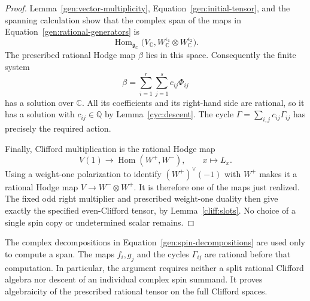 \begin{proof}
Lemma~\ref{gen:vector-multiplicity},
Equation~\eqref{gen:initial-tensor}, and the spanning calculation show
that the complex span of the maps in
Equation~\eqref{gen:rational-generators} is
\[
 \operatorname{Hom}_{\mathfrak g_{\mathbb C}}
 \bigl(V_{\mathbb C},
       W^{\epsilon_1}_{\mathbb C}\otimes
       W^{\epsilon_2}_{\mathbb C}\bigr).
\]
The prescribed rational Hodge map $\beta$ lies in this space.
Consequently the finite system
\[
 \beta=\sum_{i=1}^r\sum_{j=1}^s c_{ij}\Phi_{ij}
\]
has a solution over $\mathbb C$.  All its coefficients and its
right-hand side are rational, so it has a solution with
$c_{ij}\in\mathbb Q$ by Lemma~\ref{cyc:descent}.  The cycle
$\Gamma=\sum_{i,j}c_{ij}\Gamma_{ij}$ has precisely the required action.

Finally, Clifford multiplication is the rational Hodge map
\[
 V(1)\longrightarrow\operatorname{Hom}(W^+,W^-),
 \qquad x\longmapsto L_x.
\]
Using a weight-one polarization to identify
$(W^+)^\vee(-1)$ with $W^+$ makes it a rational Hodge map
$V\to W^-\otimes W^+$.  It is therefore one of the maps just realized.
The fixed odd right multiplier and prescribed weight-one duality
then give exactly the specified even-Clifford tensor, by
Lemma~\ref{cliff:slots}.  No choice of a single spin copy or
undetermined scalar remains.
\end{proof}

\begin{remark}\label{gen:rationality}
The complex decompositions in
Equation~\eqref{gen:spin-decompositions} are used only to compute a
span.  The maps $f_i,g_j$ and the cycles $\Gamma_{ij}$ are rational
before that computation.  In particular, the argument requires
neither a split rational Clifford algebra nor descent of an
individual complex spin summand.  It proves algebraicity of the
prescribed rational tensor on the full Clifford spaces.
\end{remark}
